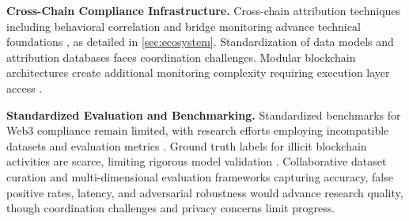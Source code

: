 \noindent\textbf{Cross-Chain Compliance Infrastructure.}
Cross-chain attribution techniques including behavioral correlation and bridge monitoring advance technical foundations \cite{yousaf2019tracingtransactionscryptocurrency,zamyatin2021sokcommunicationdistributed,zhang2024securitycrosschainbridges,li2025blockchaincrosschainbridge,lin2024crosschainabnormaltransaction}, as detailed in \autoref{sec:ecosystem}. Standardization of data models and attribution databases faces coordination challenges. Modular blockchain architectures create additional monitoring complexity requiring execution layer access \cite{xu2024exploringblockchaintechnology,chaliasos2024analyzingbenchmarkingzkrollups}.

\noindent\textbf{Standardized Evaluation and Benchmarking.}
Standardized benchmarks for Web3 compliance remain limited, with research efforts employing incompatible datasets and evaluation metrics \cite{huda2025amlnet}. Ground truth labels for illicit blockchain activities are scarce, limiting rigorous model validation \cite{sankaewtong2025sokadvances}. Collaborative dataset curation and multi-dimensional evaluation frameworks capturing accuracy, false positive rates, latency, and adversarial robustness would advance research quality, though coordination challenges and privacy concerns limit progress.
